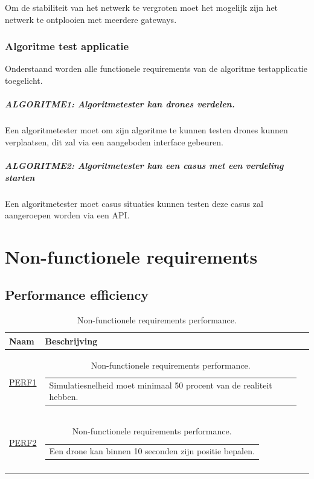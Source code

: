 \documentclass[a4paper, 11pt, oneside]{report}
\begin{document}
Om de stabiliteit van het netwerk te vergroten moet het mogelijk zijn het netwerk te ontplooien met meerdere gateways. 


\subsection{Algoritme test applicatie}
Onderstaand worden alle functionele requirements van de algoritme testapplicatie toegelicht.
\paragraph{ALGORITME1: Algoritmetester kan drones verdelen.}
\hypertarget{ALGORITME1}{}
Een algoritmetester moet om zijn algoritme te kunnen testen drones kunnen verplaatsen, dit zal via een aangeboden interface gebeuren.
\paragraph{ALGORITME2: Algoritmetester kan een casus met een verdeling starten}
\hypertarget{ALGORITME2}{}
Een algoritmetester moet casus situaties kunnen testen deze casus zal aangeroepen worden via een API. 

\chapter{Non-functionele requirements}
\section{Performance efficiency}

\begin{longtable}{|l|l|l|}
	\hline
	\rowcolor[HTML]{C0C0C0} 
	Naam & Beschrijving \\ \hline
	\endhead
	\hyperlink{PERF1}{PERF1}			&\begin{tabular}[c]{@{}l@{}}Simulatiesnelheid moet minimaal 50 procent van de realiteit hebben.	\end{tabular}\\ \hline
	\hyperlink{PERF2}{PERF2}			&\begin{tabular}[c]{@{}l@{}}Een drone kan binnen 10 seconden zijn positie bepalen.\end{tabular}\\ \hline
	\caption{Non-functionele requirements performance.}
	\label{tab:nietfunctionelecriteria:performance}
\end{longtable}
\end{document}
